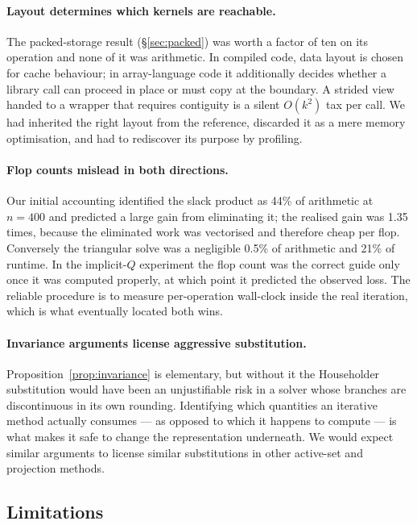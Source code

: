 \documentclass[11pt,a4paper]{article}
\theoremstyle{plain}
\theoremstyle{remark}
\begin{document}
\paragraph{Layout determines which kernels are reachable.}
The packed-storage result (\S\ref{sec:packed}) was worth a factor of ten on its
operation and none of it was arithmetic. In compiled code, data layout is chosen
for cache behaviour; in array-language code it additionally decides whether a
library call can proceed in place or must copy at the boundary. A strided view
handed to a wrapper that requires contiguity is a silent $O(k^2)$ tax per call.
We had inherited the right layout from the reference, discarded it as a mere
memory optimisation, and had to rediscover its purpose by profiling.

\paragraph{Flop counts mislead in both directions.}
Our initial accounting identified the slack product as 44\% of
arithmetic at $n = 400$ and predicted a large gain from eliminating it; the
realised gain was 1.35 times, because the eliminated work was
vectorised and therefore cheap per flop. Conversely the triangular solve was a
negligible 0.5\% of arithmetic and 21\% of runtime. In
the implicit-$Q$ experiment the flop count was the correct guide only once it was
computed properly, at which point it predicted the observed loss. The reliable
procedure is to measure per-operation wall-clock inside the real iteration, which
is what eventually located both wins.

\paragraph{Invariance arguments license aggressive substitution.}
Proposition~\ref{prop:invariance} is elementary, but without it the Householder
substitution would have been an unjustifiable risk in a solver whose branches are
discontinuous in its own rounding. Identifying which quantities an iterative
method actually consumes --- as opposed to which it happens to compute --- is
what makes it safe to change the representation underneath. We would expect
similar arguments to license similar substitutions in other active-set and
projection methods.

\subsection{Limitations}
\end{document}
